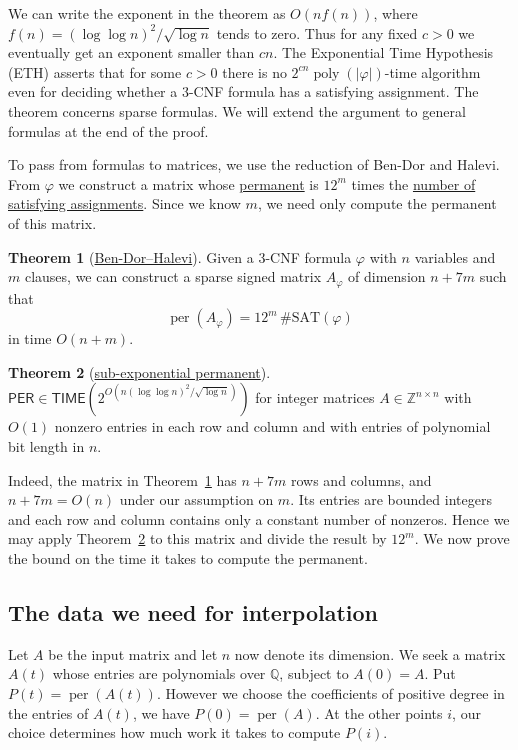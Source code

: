 \documentclass{article}
\theoremstyle{definition}
\newtheorem{theorem}{Theorem}
\newcommand{\TIME}{\mathsf{TIME}}
\newcommand{\PER}{\mathsf{PER}}
\DeclareMathOperator{\per}{per}
\newcommand{\BDHstatement}{%
Given a 3-CNF formula \(\varphi\) with \(n\) variables and \(m\) clauses, we can construct a sparse signed matrix \(A_\varphi\) of dimension \(n+7m\) such that
\[
    \per(A_\varphi)=12^m\,\#\mathrm{SAT}(\varphi)
\]
in time \(O(n+m)\).}
\begin{document}
We can write the exponent in the theorem as \(O(n f(n))\), where
\(f(n)=(\log\log n)^2/\sqrt{\log n}\) tends to zero. Thus for any fixed
\(c>0\) we eventually get an exponent smaller than \(cn\). The Exponential
Time Hypothesis (ETH) asserts that for some \(c>0\) there is no
\(2^{cn}\operatorname{poly}(|\varphi|)\)-time algorithm even for deciding
whether a 3-CNF formula has a satisfying assignment. The theorem
concerns sparse formulas. We will extend the argument to general
formulas at the end of the proof.

To pass from formulas to matrices, we use the reduction of Ben-Dor and
Halevi. From \(\varphi\) we construct a matrix whose
\hyperref[sec:permanent]{permanent} is \(12^m\) times the
\hyperref[sec:sharp-p]{number of satisfying assignments}. Since we know \(m\),
we need only compute the permanent of this matrix.

\begin{theorem}[\href{https://people.csail.mit.edu/shaih/pubs/01perm.pdf}{Ben-Dor--Halevi}]\label{thm:bdh}
\BDHstatement
\end{theorem}

\begin{theorem}[\href{https://www.cs.cmu.edu/~odonnell/some_eth_false_exposition.pdf}{sub-exponential permanent}]\label{thm:per}
    \(\displaystyle
    \PER\in\TIME\!\left(2^{O\left(n(\log\log n)^2/\sqrt{\log n}\right)}\right)\)
    for integer matrices \(A\in\mathbb Z^{n\times n}\) with \(O(1)\) nonzero
    entries in each row and column and with entries of polynomial bit length in \(n\).
\end{theorem}

Indeed, the matrix in Theorem~\ref{thm:bdh} has \(n+7m\) rows and
columns, and \(n+7m=O(n)\) under our assumption on \(m\). Its entries
are bounded integers and each row and column contains only a constant
number of nonzeros. Hence we may apply Theorem~\ref{thm:per} to this
matrix and divide the result by \(12^m\). We now prove the bound on the
time it takes to compute the permanent.

\subsection*{The data we need for interpolation}\label{sec:interpolation-goal}

Let \(A\) be the input matrix and let \(n\) now denote its dimension.
We seek a matrix \(A(t)\) whose entries are polynomials over
\(\mathbb Q\), subject to \(A(0)=A\). Put \(P(t)=\per(A(t))\).
However we choose the coefficients of positive degree in the entries of
\(A(t)\), we have \(P(0)=\per(A)\). At the other points \(i\), our
choice determines how much work it takes to compute \(P(i)\).
\end{document}
